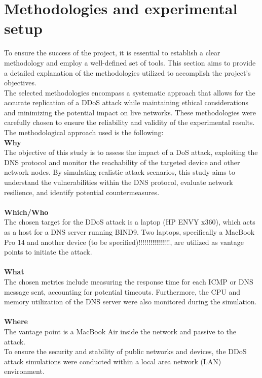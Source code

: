 \section{Methodologies and experimental setup}

To ensure the success of the project, it is essential to establish a clear methodology and employ a well-defined set of tools.
This section aims to provide a detailed explanation of the methodologies utilized to accomplish the project's objectives.\\
The selected methodologies encompass a systematic approach that allows for the accurate replication of a
DDoS attack while maintaining ethical considerations and minimizing the potential impact on live networks.
These methodologies were carefully chosen to ensure the reliability and validity of the experimental results.
The methodological approach used is the following:\\
\textbf{Why}\\
The objective of this study is to assess the impact of a DoS attack, exploiting the DNS protocol and monitor the reachability
of the targeted device and other network nodes.
By simulating realistic attack scenarios, this study aims to understand the vulnerabilities within the DNS protocol, evaluate network resilience,
and identify potential countermeasures.\\
\\
\textbf{Which/Who}\\
The chosen target for the DDoS attack is a laptop (HP ENVY x360), which acts as a host for a DNS server running BIND9.
Two laptops, specifically a MacBook Pro 14 and another device (to be specified)!!!!!!!!!!!!!!!!, are utilized as vantage points to initiate the attack.\\
\\
\textbf{What}\\
The chosen metrics include measuring the response time for each ICMP or DNS message sent, accounting for potential timeouts.
Furthermore, the CPU and memory utilization of the DNS server were also monitored during the simulation. \\
\\
\textbf{Where}\\
The vantage point is a MacBook Air inside the
network and passive to the attack.\\
To ensure the security and stability of public networks and devices,
the DDoS attack simulations were conducted within a local area network (LAN) environment.
